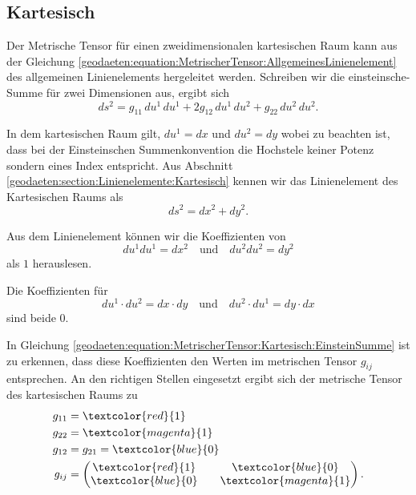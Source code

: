 %
%
%
%
\subsection{Kartesisch\label{geodaeten:section:MetrischerTensor:Kartesisch}}

Der Metrische Tensor für einen zweidimensionalen kartesischen Raum kann aus der Gleichung \eqref{geodaeten:equation:MetrischerTensor:AllgemeinesLinienelement} des allgemeinen Linienelements hergeleitet werden.
Schreiben wir die einsteinsche-Summe für zwei Dimensionen aus, ergibt sich
\begin{equation}
	ds^2 = g_{11} \, du^1 \, du^1 + 2g_{12} \, du^1 \, du^2 + g_{22} \, du^2 \, du^2.
	\label{geodaeten:equation:MetrischerTensor:Kartesisch:EinsteinSumme}
\end{equation}

In dem kartesischen Raum gilt, $du^1 = dx$ und $du^2 = dy$ wobei zu beachten ist, dass bei der Einsteinschen Summenkonvention die Hochstele keiner Potenz sondern eines Index entspricht.
Aus Abschnitt \ref{geodaeten:section:Linienelemente:Kartesisch} kennen wir das Linienelement des Kartesischen Raums als
\begin{equation}
	ds^2 = dx^2 + dy^2 .
\end{equation}

Aus dem Linienelement können wir die Koeffizienten von 
\begin{equation}
	du^1 du^1 = dx^2 \quad \text{und} \quad du^2  du^2 = dy^2 
\end{equation}
als $1$ herauslesen.

Die Koeffizienten für
\begin{equation}
	du^1 \cdot du^2 = dx \cdot dy \quad \text{und} \quad du^2 \cdot du^1 = dy \cdot dx
\end{equation}
sind beide $0$.

In Gleichung \eqref{geodaeten:equation:MetrischerTensor:Kartesisch:EinsteinSumme} ist zu erkennen, dass diese Koeffizienten den Werten im metrischen Tensor $g_{ij}$ entsprechen.
An den richtigen Stellen eingesetzt ergibt sich der metrische Tensor des kartesischen Raums zu
\begin{equation}
	\begin{aligned}
		g_{11} &= \textcolor{red}{1} \\
		g_{22} &= \textcolor{magenta}{1} \\
		g_{12} &= g_{21} = \textcolor{blue}{0} \\
		g_{ij} &= \begin{pmatrix} \textcolor{red}{1} && \textcolor{blue}{0} \\ \textcolor{blue}{0} && \textcolor{magenta}{1} \end{pmatrix} .
	\end{aligned}
\end{equation}
